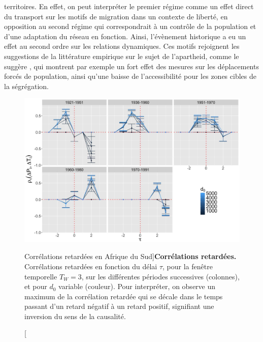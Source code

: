 {territoires. En effet, on peut interpréter le premier régime comme un effet direct du transport sur les motifs de migration dans un contexte de liberté, en opposition au second régime qui correspondrait à un contrôle de la population et d'une adaptation du réseau en fonction. Ainsi, l'évènement historique a eu un effet au second ordre sur les relations dynamiques. Ces motifs rejoignent les suggestions de la littérature empirique  sur le sujet de l'apartheid, comme le suggère \cite{baffi:tel-01389347}, qui montrent par exemple un fort effet des mesures sur les déplacements forcés de population, ainsi qu'une baisse de l'accessibilité pour les zones cibles de la ségrégation. 
}


%



\begin{figure}
\includegraphics[width=\linewidth]{Figures/Final/4-2-3-fig-causalityregimes-sudafcorrs.jpg}
\caption[Lagged correlations in South Africa][Corrélations retardées en Afrique du Sud]{\label{fig:causalityregimes:sudafcorrs}}{\textbf{Corrélations retardées.}  Corrélations retardées en fonction du délai $\tau$, pour la fenêtre temporelle $T_W=3$, sur les différentes périodes successives (colonnes), et pour $d_0$ variable (couleur). Pour interpréter, on observe un maximum de la corrélation retardée qui se décale dans le temps passant d'un retard négatif à un retard positif, signifiant une inversion du sens de la causalité.\label{fig:causalityregimes:sudafcorrs}}
\end{figure}





